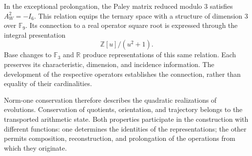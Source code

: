 In the exceptional prolongation, the Paley matrix reduced modulo \(3\)
satisfies \(A_W^2=-I_6\). This relation equips the ternary space with a
structure of dimension \(3\) over \(\mathbb F_9\). Its connection to a real
operator square root is expressed through the integral presentation
\[
 \mathbb Z[u]/(u^2+1).
\]
Base changes to \(\mathbb F_3\) and \(\mathbb R\) produce
representations of this same relation. Each preserves its characteristic,
dimension, and incidence information. The development of the
respective operators establishes the connection, rather than equality of their
cardinalities.

Norm-one conservation therefore describes the quadratic realizations
of evolutions. Conservation of quotients, orientation, and
trajectory belongs to the transported arithmetic state. Both properties
participate in the construction with different functions: one determines the
identities of the representations; the other permits composition, reconstruction, and
prolongation of the operations from which they originate.
